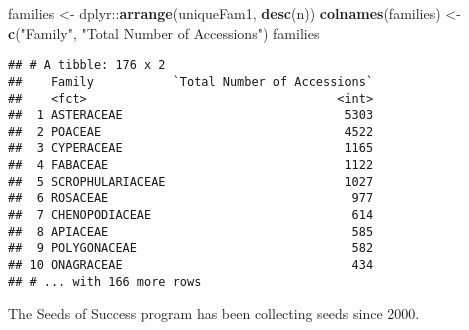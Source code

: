 \documentclass[]{article}
\newenvironment{Shaded}{\begin{snugshade}}{\end{snugshade}}
\newcommand{\KeywordTok}[1]{\textcolor[rgb]{0.13,0.29,0.53}{\textbf{{#1}}}}
\newcommand{\DataTypeTok}[1]{\textcolor[rgb]{0.13,0.29,0.53}{{#1}}}
\newcommand{\DecValTok}[1]{\textcolor[rgb]{0.00,0.00,0.81}{{#1}}}
\newcommand{\CharTok}[1]{\textcolor[rgb]{0.31,0.60,0.02}{{#1}}}
\newcommand{\StringTok}[1]{\textcolor[rgb]{0.31,0.60,0.02}{{#1}}}
\newcommand{\CommentTok}[1]{\textcolor[rgb]{0.56,0.35,0.01}{\textit{{#1}}}}
\newcommand{\NormalTok}[1]{{#1}}
\begin{document}
\begin{Shaded}
\begin{Highlighting}[]
\NormalTok{families <-}\StringTok{ }\NormalTok{dplyr::}\KeywordTok{arrange}\NormalTok{(uniqueFam1, }\KeywordTok{desc}\NormalTok{(n)) }
\KeywordTok{colnames}\NormalTok{(families) <-}\StringTok{ }\KeywordTok{c}\NormalTok{(}\StringTok{"Family"}\NormalTok{, }\StringTok{"Total Number of Accessions"}\NormalTok{)}
\NormalTok{families}
\end{Highlighting}
\end{Shaded}

\begin{verbatim}
## # A tibble: 176 x 2
##    Family           `Total Number of Accessions`
##    <fct>                                   <int>
##  1 ASTERACEAE                               5303
##  2 POACEAE                                  4522
##  3 CYPERACEAE                               1165
##  4 FABACEAE                                 1122
##  5 SCROPHULARIACEAE                         1027
##  6 ROSACEAE                                  977
##  7 CHENOPODIACEAE                            614
##  8 APIACEAE                                  585
##  9 POLYGONACEAE                              582
## 10 ONAGRACEAE                                434
## # ... with 166 more rows
\end{verbatim}

The Seeds of Success program has been collecting seeds since 2000.

\begin{Shaded}
\end{Shaded}
\end{document}
